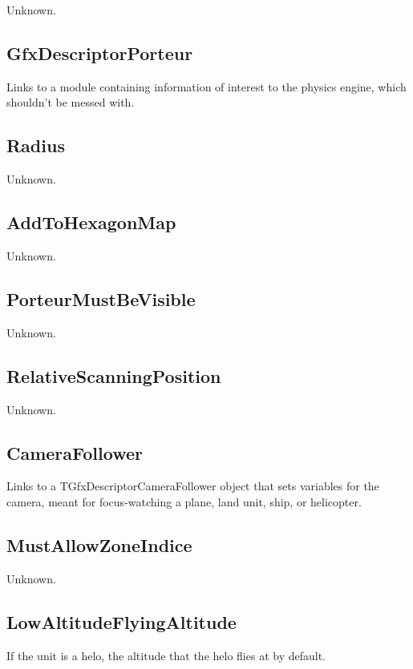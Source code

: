 \documentclass{article}
\begin{document}
Unknown.

\subsection{GfxDescriptorPorteur}

Links to a module containing information of interest to the physics engine, which shouldn't be messed with.

\subsection{Radius}

Unknown.

\subsection{AddToHexagonMap}

Unknown.

\subsection{PorteurMustBeVisible}

Unknown.

\subsection{RelativeScanningPosition}

Unknown.

\subsection{CameraFollower}

Links to a TGfxDescriptorCameraFollower object that sets variables for the camera, meant for focus-watching a plane, land unit, ship, or helicopter.

\subsection{MustAllowZoneIndice}

Unknown.

\subsection{LowAltitudeFlyingAltitude}

If the unit is a helo, the altitude that the helo flies at by default.
\end{document}
